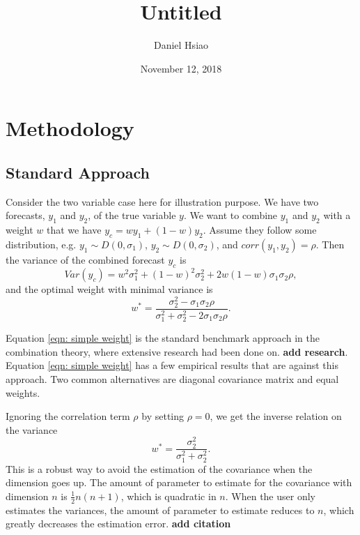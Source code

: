 \documentclass[]{article}
\title{Untitled}
\author{Daniel Hsiao}
\date{November 12, 2018}
\begin{document}
\maketitle

{
\setcounter{tocdepth}{3}
\tableofcontents
}
\newpage

\hypertarget{methodology}{%
\section{Methodology}\label{methodology}}

\hypertarget{standard-approach}{%
\subsection{Standard Approach}\label{standard-approach}}

Consider the two variable case here for illustration purpose. We have
two forecasts, \(y_1\) and \(y_2\), of the true variable \(y\). We want
to combine \(y_1\) and \(y_2\) with a weight \(w\) that we have
\(y_c = w y_1 + (1-w) y_2\). Assume they follow some distribution, e.g.
\(y_1 \sim D(0,\sigma_1)\), \(y_2 \sim D(0,\sigma_2)\), and
\(corr(y_1,y_2)=\rho\). Then the variance of the combined forecast
\(y_c\) is \begin{equation}
\label{eqn: var yc}
Var(y_c) = w^2\sigma_1^2+ (1-w)^2\sigma_2^2+2w(1-w)\sigma_1\sigma_2\rho,
\end{equation} and the optimal weight with minimal variance is
\begin{equation}
\label{eqn: simple weight}
w^*=\frac{\sigma_2^2-\sigma_1\sigma_2\rho}{\sigma_1^2+\sigma_2^2 -2\sigma_1\sigma_2\rho}.
\end{equation}

Equation \ref{eqn: simple weight} is the standard benchmark approach in
the combination theory, where extensive research had been done on.
\textbf{add research}. Equation \ref{eqn: simple weight} has a few
empirical results that are against this approach. Two common
alternatives are diagonal covariance matrix and equal weights.

Ignoring the correlation term \(\rho\) by setting \(\rho=0\), we get the
inverse relation on the variance \begin{equation}
\label{eqn: simple weight no corr}
w^*=\frac{\sigma_2^2}{\sigma_1^2+\sigma_2^2}.
\end{equation} This is a robust way to avoid the estimation of the
covariance when the dimension goes up. The amount of parameter to
estimate for the covariance with dimension \(n\) is
\(\frac{1}{2}n(n+1)\), which is quadratic in \(n\). When the user only
estimates the variances, the amount of parameter to estimate reduces to
\(n\), which greatly decreases the estimation error. \textbf{add
citation}
\end{document}
